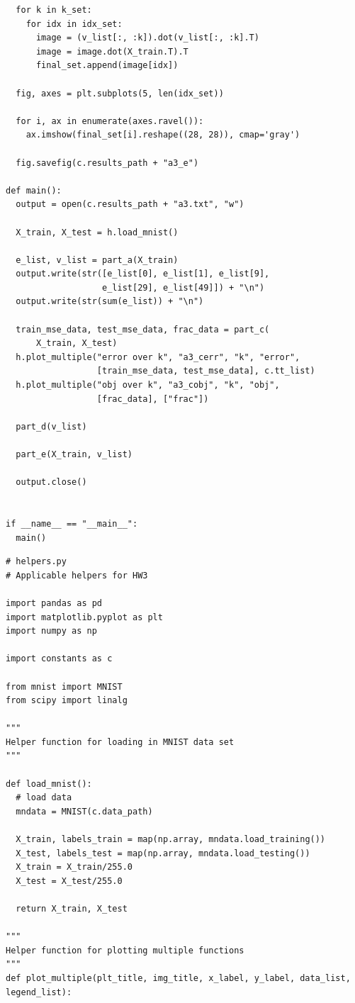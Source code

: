 \documentclass{article}
\newcommand{\1}{\mathbf{1}}
\begin{document}
{\begin{verbatim}
  for k in k_set:
    for idx in idx_set:
      image = (v_list[:, :k]).dot(v_list[:, :k].T)
      image = image.dot(X_train.T).T
      final_set.append(image[idx])

  fig, axes = plt.subplots(5, len(idx_set))

  for i, ax in enumerate(axes.ravel()):
    ax.imshow(final_set[i].reshape((28, 28)), cmap='gray')

  fig.savefig(c.results_path + "a3_e")

def main():
  output = open(c.results_path + "a3.txt", "w")

  X_train, X_test = h.load_mnist()

  e_list, v_list = part_a(X_train)
  output.write(str([e_list[0], e_list[1], e_list[9],
                   e_list[29], e_list[49]]) + "\n")
  output.write(str(sum(e_list)) + "\n")

  train_mse_data, test_mse_data, frac_data = part_c(
      X_train, X_test)
  h.plot_multiple("error over k", "a3_cerr", "k", "error", 
                  [train_mse_data, test_mse_data], c.tt_list)
  h.plot_multiple("obj over k", "a3_cobj", "k", "obj", 
                  [frac_data], ["frac"])

  part_d(v_list) 

  part_e(X_train, v_list)

  output.close()


if __name__ == "__main__":
  main()

\end{verbatim}

\begin{verbatim}
# helpers.py
# Applicable helpers for HW3

import pandas as pd
import matplotlib.pyplot as plt
import numpy as np

import constants as c

from mnist import MNIST
from scipy import linalg

"""
Helper function for loading in MNIST data set
"""

def load_mnist():
  # load data
  mndata = MNIST(c.data_path)

  X_train, labels_train = map(np.array, mndata.load_training())
  X_test, labels_test = map(np.array, mndata.load_testing())
  X_train = X_train/255.0
  X_test = X_test/255.0

  return X_train, X_test

"""
Helper function for plotting multiple functions
"""
def plot_multiple(plt_title, img_title, x_label, y_label, data_list, legend_list):
  

\end{verbatim}}
\end{document}
